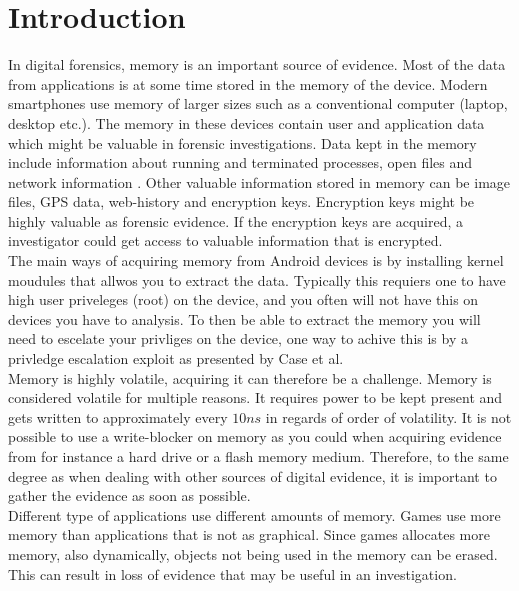 \section{Introduction}

In digital forensics, memory is an important source of evidence. Most of the data from applications is at some time 
stored in the memory of the device. Modern smartphones use memory of larger sizes such as a conventional computer (laptop, 
desktop etc.). The memory in these devices contain user and application data which might be valuable in forensic 
investigations. Data kept in the memory include information about running and terminated processes, open files and 
network information \cite{acq_vol_android_mem}. Other valuable information stored in memory can be image files, GPS data, 
web-history and encryption keys. Encryption keys might be highly valuable as forensic evidence. If the encryption keys 
are acquired, a investigator could get access to valuable information that is encrypted. \\

The main ways of acquiring memory from Android devices is by installing kernel 
moudules that allwos you to extract the data. Typically this requiers one to
have high user priveleges (root) on the device, and you often will not have 
this on devices you have to analysis. To then be able to extract the memory you 
will need to escelate your privliges on the device, one way to achive this is by
a privledge escalation exploit as presented by Case et al\cite{acq_vol_android_mem}.\\


Memory is highly volatile, acquiring it can therefore be a challenge. Memory is 
considered volatile for multiple reasons. It requires  power to be kept present
\cite{the_art_of_mem} and gets written to approximately every $10ns$ in regards
of order of volatility. %
It is not possible to use a write-blocker on memory as you could when acquiring 
evidence from for instance a hard drive or a flash memory medium. Therefore, to 
the same degree as when dealing with other sources of digital evidence, it is 
important to gather the evidence as soon as possible. \\

Different type of applications use different amounts of memory. Games use more 
memory than applications that is not as graphical. Since games allocates more 
memory, also dynamically, objects not being used in the memory can be erased. 
This can result in loss of evidence that may be useful in an investigation.\\

